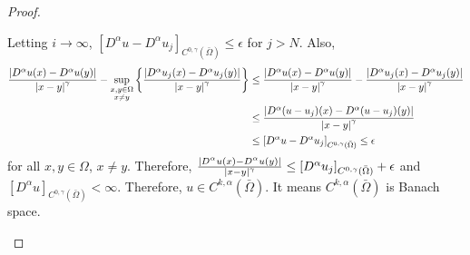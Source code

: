 \documentclass{article}
\begin{document}
\begin{proof}
\begin{enumerate}
Letting $i\rightarrow \infty$, $\left[D^\alpha u-D^\alpha u_j\right]_{C^{0,\gamma}(\bar{\Omega})}\leq \epsilon$ for $j>N$. Also,
\begin{equation*}
\begin{split}
\frac{\abs{D^\alpha u(x)-D^\alpha u(y)}}{\abs{x-y}^\gamma}-\sup_{\substack{x,y\in \Omega \\ x\neq y}}\left\{\frac{\abs{D^\alpha u_j(x)-D^\alpha u_j(y)}}{\abs{x-y}^\gamma}\right\}&\leq \frac{\abs{D^\alpha u(x)-D^\alpha u(y)}}{\abs{x-y}^\gamma}-\frac{\abs{D^\alpha u_j(x)-D^\alpha u_j(y)}}{\abs{x-y}^\gamma} \\
&\leq \frac{\abs{D^\alpha (u-u_j)(x)-D^\alpha (u-u_j)(y)}}{\abs{x-y}^\gamma} \\
&\leq \left[D^\alpha u-D^\alpha u_j\right]_{C^{0,\gamma}(\bar{\Omega})}\leq \epsilon
\end{split}
\end{equation*}
for all $x,y\in \Omega$, $x\neq y$. Therefore, $\frac{\abs{D^\alpha u(x)-D^\alpha u(y)}}{\abs{x-y}^\gamma}\leq [D^\alpha u_j]_{C^{0, \gamma}(\bar{\Omega})}+\epsilon$ and $[D^\alpha u]_{C^{0, \gamma}(\bar{\Omega})}<\infty$. Therefore, $u\in C^{k, \alpha}(\bar{\Omega})$. It means $C^{k, \alpha}(\bar{\Omega})$ is Banach space.
\end{enumerate}
\end{proof}
\end{document}

